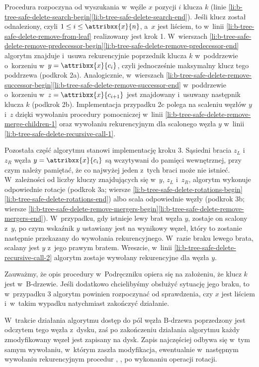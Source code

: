 Procedura rozpoczyna od wyszukania w~węźle $x$ pozycji $i$ klucza $k$ (linie \ref{li:b-tree-safe-delete-search-begin}\nbendash\ref{li:b-tree-safe-delete-search-end}).
Jeśli klucz został odnaleziony, czyli $1\le i\le\attribxx{x}{n}$, a~$x$ jest liściem, to w~linii \ref{li:b-tree-safe-delete-remove-from-leaf} realizowany jest krok 1.
W~wierszach \ref{li:b-tree-safe-delete-remove-predecessor-begin}\nbendash\ref{li:b-tree-safe-delete-remove-predecessor-end} algorytm znajduje i~usuwa rekurencyjnie poprzednik klucza $k$ w~poddrzewie o~korzeniu w~$y=\attribxx{x}{c_i}$, czyli jednocześnie maksymalny klucz tego poddrzewa (podkrok 2a).
Analogicznie, w~wierszach \ref{li:b-tree-safe-delete-remove-successor-begin}\nbendash\ref{li:b-tree-safe-delete-remove-successor-end} w~poddrzewie o~korzeniu w~$z=\attribxx{x}{c_{i+1}}$ jest znajdowany i~usuwany następnik klucza $k$ (podkrok 2b).
Implementacja przypadku 2c polega na scaleniu węzłów $y$ i~$z$ dzięki wywołaniu procedury pomocniczej w~linii \ref{li:b-tree-safe-delete-remove-merge-children-1} oraz wywołaniu rekurencyjnym dla scalonego węzła $y$ w~linii \ref{li:b-tree-safe-delete-recursive-call-1}.

Pozostała część algorytmu stanowi implementację kroku 3.
Sąsiedni bracia $z_L$ i~$z_R$ węzła $y=\attribxx{x}{c_i}$ są wczytywani do pamięci wewnętrznej, przy czym należy pamiętać, że co najwyżej jeden z~tych braci może nie istnieć.
W~zależności od liczby kluczy znajdujących się w~$y$, $z_L$ i~$z_R$, algorytm wykonuje odpowiednie rotacje (podkrok 3a; wiersze \ref{li:b-tree-safe-delete-rotations-begin}\nbendash\ref{li:b-tree-safe-delete-rotations-end}) albo scala odpowiednie węzły (podkrok 3b; wiersze \ref{li:b-tree-safe-delete-remove-mergers-begin}\nbendash\ref{li:b-tree-safe-delete-remove-mergers-end}).
W~przypadku, gdy istnieje lewy brat węzła $y$, zostaje on scalony z~$y$, po czym wskaźnik $y$ ustawiany jest na wynikowy węzeł, który to zostanie następnie przekazany do wywołania rekurencyjnego.
W~razie braku lewego brata, scalany jest $y$ z~jego prawym bratem.
Wreszcie, w~linii \ref{li:b-tree-safe-delete-recursive-call-2} algorytm zostaje wywołany rekurencyjne dla węzła $y$.

Zauważmy, że opis procedury w~Podręczniku opiera się na założeniu, że klucz $k$ jest w~B-drzewie.
Jeśli dodatkowo chcielibyśmy obsłużyć sytuację jego braku, to w~przypadku 3 algorytm powinien rozpoczynać od sprawdzenia, czy $x$ jest liściem i~w~takim wypadku natychmiast zakończyć działanie.

W~trakcie działania algorytmu dostęp do pól węzła B-drzewa poprzedzony jest odczytem tego węzła z~dysku, zaś po zakończeniu działania algorytmu każdy zmodyfikowany węzeł jest zapisany na dysk.
Zapis najczęściej odbywa się w~tym samym wywołaniu, w~którym zaszła modyfikacja, ewentualnie w~następnym wywołaniu rekurencyjnym procedur , ,  po wykonaniu operacji rotacji.

